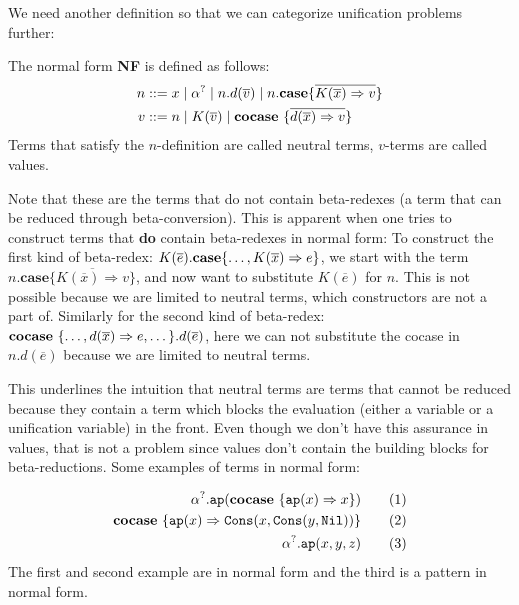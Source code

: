 \documentclass[twoside,12pt,a4paper]{article}
\begin{document}
We need another definition so that we can categorize unification problems further:
\begin{definition}
    The normal form \textbf{NF} is defined as follows:
    \begin{align*}
        n &::= x \;|\; \alpha^? \;|\; n.d(\overline{v})\;|\; n.\textbf{case}\{\overline{K(\overline{x})\Rightarrow v}\}\\
        v &::= n \;|\; K(\overline{v}) \;|\; \textbf{cocase}\ \{\overline{d(\overline{x})\Rightarrow v}\}
    \end{align*}
    Terms that satisfy the $n$-definition are called neutral terms, $v$-terms are called values.
\end{definition}
Note that these are the terms that do not contain beta-redexes (a term that can be reduced through beta-conversion).
This is apparent when one tries to construct terms that \textbf{do} contain beta-redexes in normal form: 
To construct the first kind of beta-redex: $K(\overline{e}).\textbf{case}\{\dots,K(\overline{x})\Rightarrow e\}$,
we start with the term $n.\textbf{case}\{\overline{K(\overline{x})\Rightarrow v}\}$, and now want to substitute $K(\overline{e})$ for $n$. 
This is not possible because we are limited to neutral terms, which constructors are not a part of.
Similarly for the second kind of beta-redex:
$\textbf{cocase}\ \{\dots,d(\overline{x}) \Rightarrow e, \dots\}.d(\overline{e})$, 
here we can not substitute the cocase in $n.d(\overline{e})$ because we are limited to neutral terms.
        
This underlines the intuition that neutral terms are terms that cannot be reduced because
they contain a term which blocks the evaluation (either a variable or a unification variable) in the front.
Even though we don't have this assurance in values, that is not a problem since values don't contain the building blocks for beta-reductions. 
Some examples of terms in normal form: 
\begin{example}
\begin{align*}
    \alpha^?.\texttt{ap}(\textbf{cocase}\ \{\texttt{ap}(x)\Rightarrow x\}) \tag{1}\\
    \textbf{cocase}\ \{\texttt{ap}(x)\Rightarrow \mathtt{Cons(\mathnormal{x}, Cons(\mathnormal{y}, Nil))}\} \tag{2}\\
    \alpha^?.\texttt{ap}(x, y, z) \tag{3}    
\end{align*}
The first and second example are in normal form and the third is a pattern in normal form.
\end{example}
\end{document}
